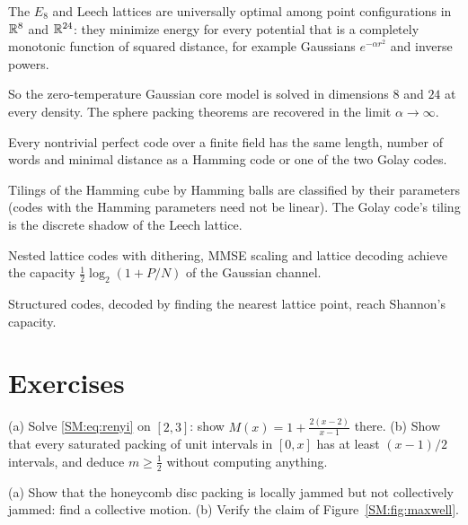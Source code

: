 \begin{theorem}
The $E_8$ and Leech lattices are universally optimal among point configurations in $\mathbb{R}^8$ and $\mathbb{R}^{24}$:
they minimize energy for every potential that is a completely monotonic function of squared distance,
for example Gaussians $e^{-\alpha r^2}$ and inverse powers.
\end{theorem}
\noindent So the zero-temperature Gaussian core model is solved in dimensions $8$ and $24$ at every
density. The sphere packing theorems are recovered in the limit $\alpha\to\infty$.

\begin{theorem}\label{SM:thm:perfect}
Every nontrivial perfect code over a finite field has the same length, number of words and minimal
distance as a Hamming code or one of the two Golay codes.
\end{theorem}
\noindent Tilings of the Hamming cube by Hamming balls are classified by their parameters (codes with
the Hamming parameters need not be linear). The Golay code's tiling is the
discrete shadow of the Leech lattice.

\begin{theorem}
Nested lattice codes with dithering, MMSE scaling and lattice decoding achieve the capacity
$\frac12\log_2(1+P/N)$ of the Gaussian channel.
\end{theorem}
\noindent Structured codes, decoded by finding the nearest lattice point, reach Shannon's capacity.

\section*{Exercises}


\begin{exercise}
(a) Solve \eqref{SM:eq:renyi} on $[2,3]$: show $M(x)=1+\frac{2(x-2)}{x-1}$ there. (b) Show that every saturated
packing of unit intervals in $[0,x]$ has at least $(x-1)/2$ intervals, and deduce $m\ge\frac12$ without
computing anything.
\end{exercise}

\begin{exercise}
(a) Show that the honeycomb disc packing is locally jammed but not collectively jammed: find a collective
motion. (b) Verify the claim of Figure~\ref{SM:fig:maxwell}.
\end{exercise}


